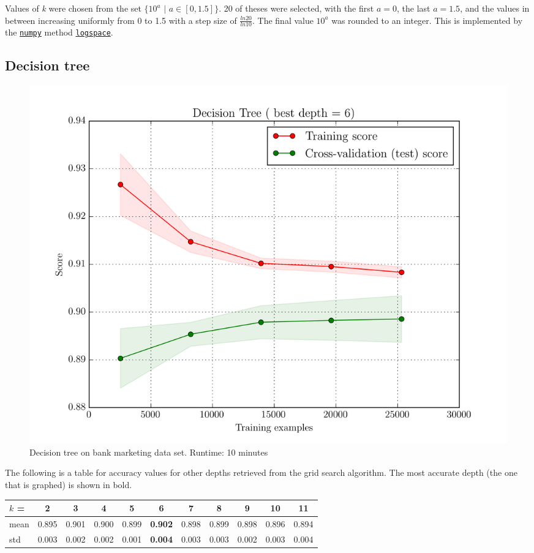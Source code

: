 Values of \textit{k} were chosen from the set $\{10^{a}$ $|$ $a \in [0, 1.5]\}$. 20 of theses were selected, with the first $a=0$, the last $a=1.5$, and the values in between increasing uniformly from 0 to 1.5 with a step size of $\frac{ln20}{ln10}$. The final value $10^{a}$ was rounded to an integer. This is implemented by the \href{http://docs.scipy.org/doc/numpy-1.10.0/index.html}{\texttt{numpy}} method \href{http://docs.scipy.org/doc/numpy-1.10.0/reference/generated/numpy.logspace.html}{\texttt{logspace}}.

\subsection{Decision tree}

\begin{figure}[H]
    \centering
    \includegraphics[width=.7\textwidth]{bank/tree.png}
    \caption{Decision tree on bank marketing data set. Runtime: 10 minutes}
\end{figure}
The following is a table for accuracy values for other depths retrieved from the grid search algorithm.
The most accurate depth (the one that is graphed) is shown in bold.
\begin{center}
    \begin{tabular}{l|| c | c | c | c | c | c | c | c | c | c}
        $k$ = & 2     & 3     & 4     & 5     & \textbf{6}     & 7     & 8     & 9     & 10    & 11\\
         \hline
         mean & 0.895 & 0.901 & 0.900 & 0.899 & \textbf{0.902} & 0.898 & 0.899 & 0.898 & 0.896 & 0.894\\
         std  & 0.003 & 0.002 & 0.002 & 0.001 & \textbf{0.004} & 0.003 & 0.003 & 0.002 & 0.003 & 0.004
    \end{tabular}
\end{center}

